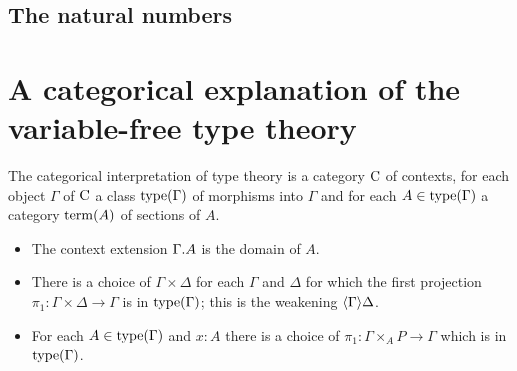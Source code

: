 \subsection{The natural numbers}

\section{A categorical explanation of the variable-free type theory}

The categorical interpretation of type theory is a category $\mathrm{C}$ of
contexts, for each object $\Gamma$ of $\mathrm{C}$ a class $\mathrm{type}(\Gamma)$
of morphisms into $\Gamma$ and for each $A\in\mathrm{type}(\Gamma)$ a category
$\mathrm{term}(A)$ of sections of $A$. 

\begin{itemize}
\item The context extension $\ctxext{\Gamma}{A}$ is the domain of $A$.
\item There is a choice of $\Gamma\times\Delta$ for each $\Gamma$ and $\Delta$
      for which the first projection $\pi_1:\Gamma\times\Delta\to\Gamma$ is in $\mathrm{type}(\Gamma)$;
      this is the weakening $\ctxwk{\Gamma}{\Delta}$.
\item For each $A\in\mathrm{type}(\Gamma)$ and $x:A$ there is a choice of
      $\pi_1:\Gamma\times_A P\to\Gamma$ which is in $\mathrm{type}(\Gamma)$.
\end{itemize}

